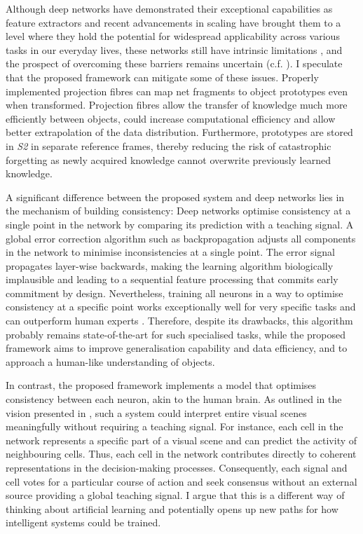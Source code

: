 Although deep networks have demonstrated their exceptional capabilities as feature extractors and recent advancements in scaling have brought them to a level where they hold the potential for widespread applicability across various tasks in our everyday lives, these networks still have intrinsic limitations \cite{akhtar_threat_2018, long_survey_2022, madan_when_2022, marcus_deep_2018, smith_using_2022, garcia-martin_estimation_2019, kirkpatrick_overcoming_2017, rosenbloom_defining_2023, mitchell_debate_2023}, and the prospect of overcoming these barriers remains uncertain (c.f. ).
I speculate that the proposed framework can mitigate some of these issues. Properly implemented projection fibres can map net fragments to object prototypes even when transformed. Projection fibres allow the transfer of knowledge  much more efficiently between objects, could increase computational efficiency and allow better extrapolation of the data distribution. Furthermore, prototypes are stored in \emph{S2} in separate reference frames, thereby reducing the risk of catastrophic forgetting  as newly acquired knowledge cannot overwrite previously learned knowledge.

A significant difference between the proposed system and deep networks lies in the mechanism of building consistency:
Deep networks optimise consistency at a single point in the network by comparing its prediction with a teaching signal.
A global error correction algorithm such as backpropagation adjusts all components in the network to minimise inconsistencies at a single point.
The error signal propagates layer-wise backwards, making the learning algorithm biologically implausible and leading to a sequential feature processing that commits early commitment  by design.
Nevertheless, training all neurons in a way to optimise consistency at a specific point works exceptionally well for very specific tasks and can outperform human experts . Therefore, despite its drawbacks, this algorithm probably remains state-of-the-art for such specialised tasks, while the proposed framework aims to improve generalisation capability and data efficiency, and to approach a human-like understanding of objects.

In contrast, the proposed framework implements a model that optimises consistency between each neuron, akin to the human brain.
As outlined in the vision presented in , such a system could interpret entire visual scenes meaningfully without requiring a teaching signal.
For instance, each cell in the network represents a specific part of a visual scene and can predict the activity of neighbouring cells.
Thus, each cell in the network contributes directly to coherent representations in the decision-making processes. Consequently, each signal and cell votes for a particular course of action and seek consensus without an external source providing a global teaching signal.
I argue that this is a different way of thinking about artificial learning and potentially opens up new paths for how intelligent systems could be trained.


